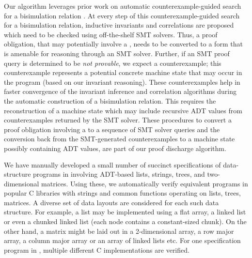 Our algorithm leverages prior work on automatic counterexample-guided
search for a
bisimulation relation \cite{oopsla20}.
At every step of this counterexample-guided search for
a bisimulation relation,
inductive invariants and correlations are proposed which need to
be checked using off-the-shelf SMT solvers.
Thus, a proof obligation, that may potentially involve a
\recursiveRelation{}, needs to be converted to a form that is
amenable for reasoning through an SMT solver.
Further, if an SMT proof query is determined to be {\em not provable},
we expect a counterexample; this counterexample represents
a potential concrete machine state that may
occur in the program (based on our invariant
reasoning).
These counterexamples help in faster convergence
of the invariant inference and correlation algorithms
during the automatic construction of a bisimulation relation.
This requires the reconstruction of a machine state which may include
recursive ADT values from counterexamples returned by the SMT solver.
These procedures to convert a proof obligation involving a \recursiveRelation{}
to a sequence of SMT solver queries and the conversion back from the SMT-generated
counterexamples to a machine state possibly containing ADT values, are part
of our proof discharge algorithm.

We have manually
developed a small
number of succinct specifications of data-structure
programs in \SpecL{}
involving ADT-based
lists, strings, trees, and two-dimensional matrices.
Using these,
we automatically verify
equivalent programs in
popular C libraries with
strings and common functions operating
on lists, trees, matrices.
A diverse set of data layouts are
considered for each such data structure.
For example, a list may be implemented
using a flat array, a linked list or even
a chunked linked list (each node contains a constant-sized chunk).
On the other hand, a matrix might be laid out in a 2-dimensional array,
a row major array, a column major array or an array of linked lists etc.
For one specification program in \SpecL{}, multiple
different C
implementations are verified.
